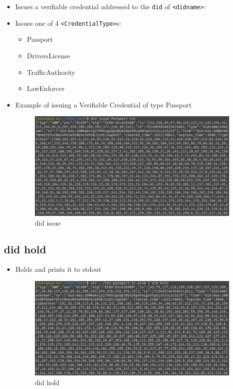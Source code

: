 \begin{itemize}
\item
  Issues a verifiable credential addressed to the
  \lstinline!did! of \lstinline!<didname>!:
\item
  Issues one of 4 \lstinline!<CredentialType>!s:

  \begin{itemize}
  \tightlist
  \item
    Passport
  \item
    DriversLicense
  \item
    TrafficAuthority
  \item
    LawEnforcer
  \end{itemize}
\item
  Example of issuing a Verifiable Credential of type Passport

  \begin{figure}
  \centering
  \includegraphics[width=\textwidth]{User Interface f8759a9462b24d5f95cf6123d68b89ea/Untitled 10.png}
  \caption{did issue}
  \end{figure}
\end{itemize}

\hypertarget{did-hold}{%
\subsection{\texorpdfstring{did hold }{did hold }}\label{did-hold}}

\begin{itemize}
\item
  Holds and prints it to stdout

  \begin{figure}
  \centering
  \includegraphics[width=\textwidth]{User Interface f8759a9462b24d5f95cf6123d68b89ea/Untitled 11.png}
  \caption{did hold}
  \end{figure}
\end{itemize}


